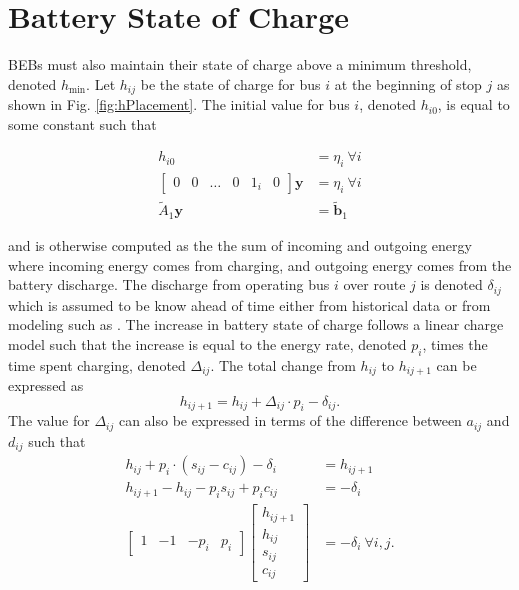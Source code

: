 \section{Battery State of Charge\label{sec:5_battery}}
BEBs must also maintain their state of charge above a minimum threshold, denoted $h_{\text{min}}$. Let $h_{ij}$ be the state of charge for bus $i$ at the beginning of stop $j$ as shown in Fig. \ref{fig:hPlacement}. The initial value for bus $i$, denoted $h_{i0}$, is equal to some constant such that

\begin{equation}\label{eqn:initialSoc0}\begin{aligned}
	h_{i0} &= \eta_{i} \ \forall i \\
	\begin{bmatrix}0 & 0 & \hdots & 0 & 1_i& 0 \end{bmatrix}\mathbf{y} &= \eta_i \ \forall i \\
		\tilde{A}_1\mathbf{y} &= \tilde{\mathbf{b}}_1
\end{aligned} \end{equation}

and is otherwise computed as the the sum of incoming and outgoing energy where incoming energy comes from charging, and outgoing energy comes from the battery discharge. The discharge from operating bus $i$ over route $j$ is denoted $\delta_{ij}$ which is assumed to be know ahead of time either from historical data or from modeling such as \cite{Ji_2022_Trip}. The increase in battery state of charge follows a linear charge model such that the increase is equal to the energy rate, denoted $p_i$, times the time spent charging, denoted $\Delta_{ij}$\cite{rong_coordinated_2016}.
The total change from $h_{ij}$ to $h_{ij+1}$ can be expressed as
\begin{equation}
	h_{ij+1} = h_{ij} + \Delta_{ij} \cdot p_i - \delta_{ij}.
\end{equation}
The value for $\Delta_{ij}$ can also be expressed in terms of the difference between $a_{ij}$ and $d_{ij}$ such that
\begin{equation}\label{eqn:socDynamic1}\begin{aligned}
	h_{ij} + p_i\cdot \left ( s_{ij} - c_{ij} \right ) - \delta_i &= h_{ij+1}\\
	h_{ij+1} - h_{ij} - p_is_{ij} + p_ic_{ij} &= -\delta_i\\
	\begin{bmatrix} 1 & -1 & -p_i & p_i\end{bmatrix} \begin{bmatrix}h_{ij+1} \\ h_{ij} \\ s_{ij} \\ c_{ij} \end{bmatrix} &= -\delta_i \ \forall i,j.
\end{aligned}\end{equation}
